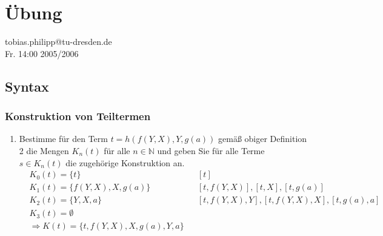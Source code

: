 
\chapter{Übung}
tobias.philipp@tu-dresden.de\\ Fr. 14:00 2005/2006
\section{Syntax}
\subsection{Konstruktion von Teiltermen}
\begin{enumerate}
	\item Bestimme für den Term \( t = h(f(Y,X),Y,g(a)) \) gemäß obiger Definition 2 die Mengen \(K_{n}(t)\) für alle \(n \in \mathbb{N} \)  und geben Sie für alle Terme \(s\in K_{n}(t)\) die zugehörige Konstruktion an.
	\begin{align*}
	&K_{0}(t) = \{t\}&&[t]\\
	&K_{1}(t) = \{f(Y,X),X,g(a)\}&&[t,f(Y,X)],[t,X],[t,g(a)]\\
	&K_{2}(t) = \{Y,X,a\}&&[t,f(Y,X),Y],                          [t,f(Y,X),X],[t,g(a),a]\\
	&K_{3}(t) = \emptyset\\
	&\Rightarrow K(t) = \{t,f(Y,X),X,g(a),Y,a\}
	\end{align*}			


\end{enumerate}

